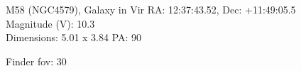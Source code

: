 \begin{block}{M58 (NGC4579), Galaxy in Vir}
    RA: 12:37:43.52, Dec: +11:49:05.5 \\ 
    Magnitude (V): 10.3 \\ 
    Dimensions: 5.01 x 3.84 PA: 90 

    Finder fov: 30 
\end{block}